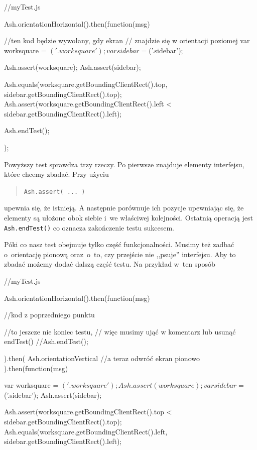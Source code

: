 \documentclass{xmgr}
\begin{document}
\begin{enumerate}
 \begin{javascriptcode}
  //myTest.js

  Ash.orientationHorizontal().then(function(msg){
     //ten kod będzie wywołany, gdy ekran 
     // znajdzie się w orientacji poziomej
      var worksquare = $('.worksquare');
      var sidebar = $('.sidebar');

      Ash.assert(worksquare);
      Ash.assert(sidebar);

      Ash.equals(worksquare.getBoundingClientRect().top,
           sidebar.getBoundingClientRect().top);
     Ash.assert(worksquare.getBoundingClientRect().left <
           sidebar.getBoundingClientRect().left);

      Ash.endTest();
    });  
\end{javascriptcode}

Powyższy test sprawdza trzy rzeczy. Po pierwsze znajduje elementy interfejsu, które chcemy zbadać. Przy użyciu 

\begin{quote}
  \texttt{Ash.assert( ... )} 
\end{quote}

upewnia się, że istnieją. A następnie porównuje ich pozycje upewniając się, że elementy są ułożone obok siebie i~we właściwej kolejności. Ostatnią operacją jest \texttt{Ash.endTest()} co oznacza zakończenie testu sukcesem.

Póki co nasz test obejmuje tylko część funkcjonalności. Musimy też zadbać o~orientację pionową oraz~o~to, czy przejście nie ,,psuje'' interfejsu. Aby to zbadać możemy dodać dalszą część testu. Na przykład w~ten sposób

 \begin{javascriptcode}
  //myTest.js

  Ash.orientationHorizontal().then(function(msg){
       //kod z poprzedniego punktu

      //to jeszcze nie koniec testu, 
      //  więc musimy ująć w komentarz lub usunąć endTest()
      //Ash.endTest();
  }).then(
      Ash.orientationVertical //a teraz odwróć ekran pionowo
    ).then(function(msg){
      var worksquare = $('.worksquare');
      Ash.assert(worksquare);
      
      var sidebar = $('.sidebar');
      Ash.assert(sidebar);

      Ash.assert(worksquare.getBoundingClientRect().top <
sidebar.getBoundingClientRect().top);
      Ash.equals(worksquare.getBoundingClientRect().left,
sidebar.getBoundingClientRect().left);        

}
\end{javascriptcode}
\end{enumerate}
\end{document}
